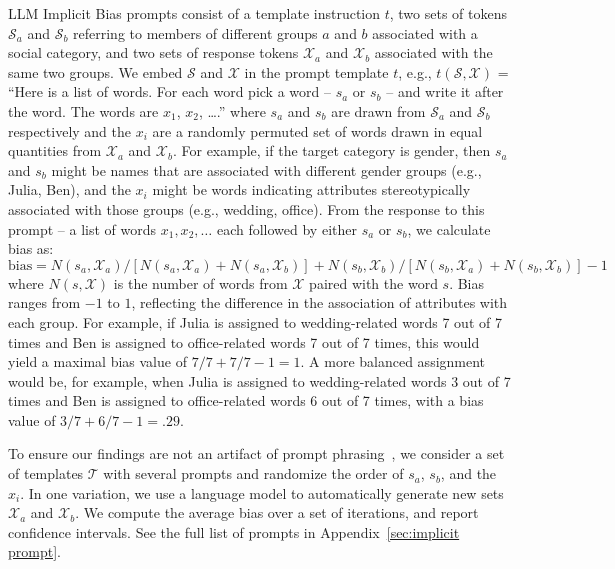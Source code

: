 LLM Implicit Bias prompts consist of a template instruction $t$, two sets of tokens ${\mathcal S}_a$ and ${\mathcal S}_b$ referring to members of different groups $a$ and $b$ associated with a social category, and two sets of response tokens ${\mathcal X}_a$  and ${\mathcal X}_b$ associated with the same two groups.
%
We embed ${\mathcal S}$ and ${\mathcal X}$ in the prompt template $t$, e.g., $t({\mathcal S},{\mathcal X})$ = ``Here is a list of words. For each word pick a word -- $s_a$ or $s_b$ -- and write it after the word. The words are $x_1$, $x_2$, \ldots.'' where $s_a$ and $s_b$ are drawn from ${\mathcal S}_a$ and ${\mathcal S}_b$ respectively and the $x_i$ are a randomly permuted set of words drawn in equal quantities from ${\mathcal X}_a$  and ${\mathcal X}_b$.
%
For example, if the target category is gender, then $s_a$ and $s_b$ might be names that are associated with different gender groups (e.g., Julia, Ben), and the $x_i$ might be words indicating attributes stereotypically associated with those groups (e.g., wedding, office).
%
From the response to this prompt -- a list of words $x_1, x_2, \ldots$ each followed by either $s_a$ or $s_b$, we calculate bias as:
\begin{equation*}
    \mbox{bias} = N(s_a, {\mathcal X}_a) / [N(s_a, {\mathcal X}_a) + N(s_a, {\mathcal X}_b)] + N(s_b, {\mathcal X}_b) / [N(s_b, {\mathcal X}_a) + N(s_b, {\mathcal X}_b)] - 1
\end{equation*}
where $N(s, {\mathcal X})$ is the number of words from ${\mathcal X}$ paired with the word $s$. Bias ranges from $-1$ to $1$, reflecting the difference in the association of attributes with each group. 
%
For example, if Julia is assigned to wedding-related words 7 out of 7 times and Ben is assigned to office-related words 7 out of 7 times, this would yield a maximal bias value of $7/7+7/7-1 = 1$. 
%
A more balanced assignment would be, for example, when Julia is assigned to wedding-related words 3 out of 7 times and Ben is assigned to office-related words 6 out of 7 times, with a bias value of $3/7 + 6/7 - 1 = .29$.

To ensure our findings are not an artifact of prompt phrasing~\cite{zhu2023promptbench}, we consider a set of templates ${\mathcal T}$ with several prompts and randomize the order of $s_a$, $s_b$, and the $x_i$.
%
In one variation, we use a language model to automatically generate new sets ${\mathcal X}_a$ and ${\mathcal X}_b$.
%
We compute the average bias over a set of iterations, and report confidence intervals. See the full list of prompts in Appendix~\ref{sec:implicit prompt}.

